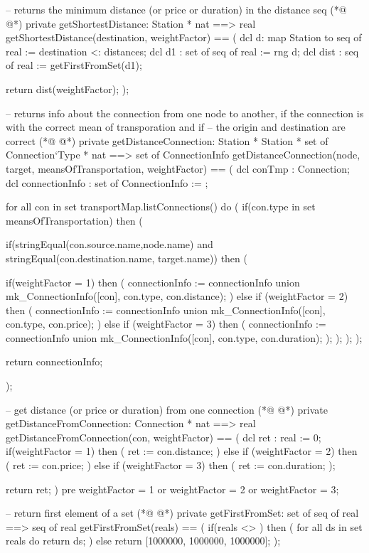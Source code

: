 \begin{vdmpp}[breaklines=true]
 -- returns the minimum distance (or price or duration) in the distance seq
(*@
\label{getShortestDistance:190}
@*)
 private getShortestDistance: Station * nat ==> real 
 getShortestDistance(destination, weightFactor) == 
 (
  dcl d: map Station to seq of real := {destination} <: distances;
  dcl d1 : set of seq of real := rng d;
  dcl dist : seq of real := getFirstFromSet(d1);
  
  return dist(weightFactor);
 );
 
 -- returns info about the connection from one node to another, if the connection is with the correct mean of transporation and if
 -- the origin and destination are correct
(*@
\label{getDistanceConnection:202}
@*)
 private getDistanceConnection: Station * Station * set of Connection`Type * nat ==> set of ConnectionInfo
 getDistanceConnection(node, target, meansOfTransportation, weightFactor) ==
 (
  dcl conTmp : Connection;
  dcl connectionInfo : set of ConnectionInfo := {};
  
  for all con in set transportMap.listConnections() do (  
   if(con.type in set meansOfTransportation) then (
   
    if(stringEqual(con.source.name,node.name) and stringEqual(con.destination.name, target.name)) then (
     
     if(weightFactor = 1) then (
      connectionInfo := connectionInfo union {mk_ConnectionInfo([con], con.type, con.distance)};
     ) 
     else if (weightFactor = 2) then (
      connectionInfo := connectionInfo union {mk_ConnectionInfo([con], con.type, con.price)};
     )
     else if (weightFactor = 3) then (
      connectionInfo := connectionInfo union {mk_ConnectionInfo([con], con.type, con.duration)};
     );
    );
   );
  );
  
  return connectionInfo;
  
 );
 
 -- get distance (or price or duration) from one connection
(*@
\label{getDistanceFromConnection:231}
@*)
 private getDistanceFromConnection: Connection * nat ==> real
 getDistanceFromConnection(con, weightFactor) ==
 (
  dcl ret : real := 0;
  if(weightFactor = 1) then (
   ret := con.distance;
  ) 
  else if (weightFactor = 2) then (
   ret := con.price;
  )
  else if (weightFactor = 3) then (
   ret := con.duration;
  );
  
  return ret;
 )
 pre weightFactor = 1 or weightFactor = 2 or weightFactor = 3;
 
 -- return first element of a set 
(*@
\label{getFirstFromSet:250}
@*)
 private getFirstFromSet: set of seq of real ==> seq of real
 getFirstFromSet(reals) == 
 (
  if(reals <> {}) then (
   for all ds in set reals do return ds;
  )
  else return [1000000, 1000000, 1000000];
 );
 

\end{vdmpp}
